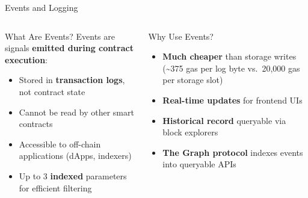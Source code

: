 \documentclass[8pt,aspectratio=169]{beamer}
\begin{document}
\begin{frame}{Events and Logging}
\begin{columns}[T]
\begin{block}{What Are Events?}
\footnotesize
Events are signals \textbf{emitted during contract execution}:
\begin{itemize}
  \item Stored in \textbf{transaction logs}, not contract state
  \item Cannot be read by other smart contracts
  \item Accessible to off-chain applications (dApps, indexers)
  \item Up to 3 \textbf{indexed} parameters for efficient filtering
\end{itemize}
\end{block}
\vspace{2mm}
\begin{block}{Why Use Events?}
\footnotesize
\begin{itemize}
  \item \textbf{Much cheaper} than storage writes (\textasciitilde375 gas per log byte vs.\ 20,000 gas per storage slot)
  \item \textbf{Real-time updates} for frontend UIs
  \item \textbf{Historical record} queryable via block explorers
  \item \textbf{The Graph protocol} indexes events into queryable APIs
\end{itemize}
\end{block}

\centering
\vspace{2mm}
\end{columns}
\end{frame}
\end{document}
